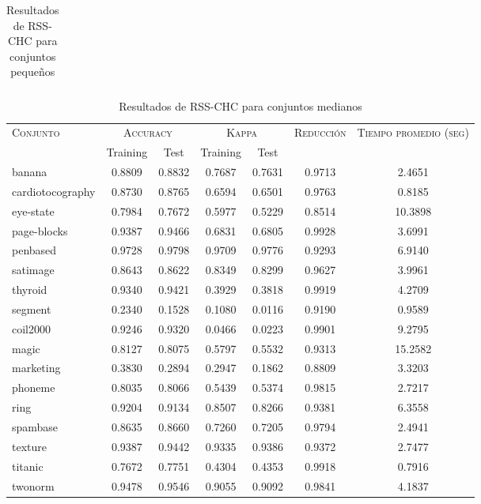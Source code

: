 \begin{table}[]
\begin{tabular}{l c c c c c c}
\hline
\end{tabular}
\caption{Resultados de RSS-CHC para conjuntos pequeños }
\label{res-peq-RSS-CHC}
\end{table}


\begin{table}[]
\centering
\begin{tabular}{l c c c c c c}
\hline
\multirow{2}{*}{\textsc{Conjunto}}
	& \multicolumn{2}{c}{\textsc{Accuracy}}
	& \multicolumn{2}{c}{\textsc{Kappa}}
	& \textsc{Reducción}
	& \textsc{Tiempo promedio (seg)} \\
	& Training & Test
	& Training & Test \\ 
\hline
\hline

banana & 0.8809 & 0.8832 & 0.7687 & 0.7631 & 0.9713 & 2.4651 \\
cardiotocography & 0.8730 & 0.8765 & 0.6594 & 0.6501 & 0.9763 & 0.8185 \\
eye-state & 0.7984 & 0.7672 & 0.5977 & 0.5229 & 0.8514 & 10.3898 \\
page-blocks & 0.9387 & 0.9466 & 0.6831 & 0.6805 & 0.9928 & 3.6991 \\
penbased & 0.9728 & 0.9798 & 0.9709 & 0.9776 & 0.9293 & 6.9140 \\
satimage & 0.8643 & 0.8622 & 0.8349 & 0.8299 & 0.9627 & 3.9961 \\
thyroid & 0.9340 & 0.9421 & 0.3929 & 0.3818 & 0.9919 & 4.2709 \\
segment & 0.2340 & 0.1528 & 0.1080 & 0.0116 & 0.9190 & 0.9589 \\
coil2000 & 0.9246 & 0.9320 & 0.0466 & 0.0223 & 0.9901 & 9.2795 \\
magic & 0.8127 & 0.8075 & 0.5797 & 0.5532 & 0.9313 & 15.2582 \\
marketing & 0.3830 & 0.2894 & 0.2947 & 0.1862 & 0.8809 & 3.3203 \\
phoneme & 0.8035 & 0.8066 & 0.5439 & 0.5374 & 0.9815 & 2.7217 \\
ring & 0.9204 & 0.9134 & 0.8507 & 0.8266 & 0.9381 & 6.3558 \\
spambase & 0.8635 & 0.8660 & 0.7260 & 0.7205 & 0.9794 & 2.4941 \\
texture & 0.9387 & 0.9442 & 0.9335 & 0.9386 & 0.9372 & 2.7477 \\
titanic & 0.7672 & 0.7751 & 0.4304 & 0.4353 & 0.9918 & 0.7916 \\
twonorm & 0.9478 & 0.9546 & 0.9055 & 0.9092 & 0.9841 & 4.1837 \\

\hline
\end{tabular}
\caption{Resultados de RSS-CHC para conjuntos medianos }
\label{res-med-RSS-CHC}
\end{table}


